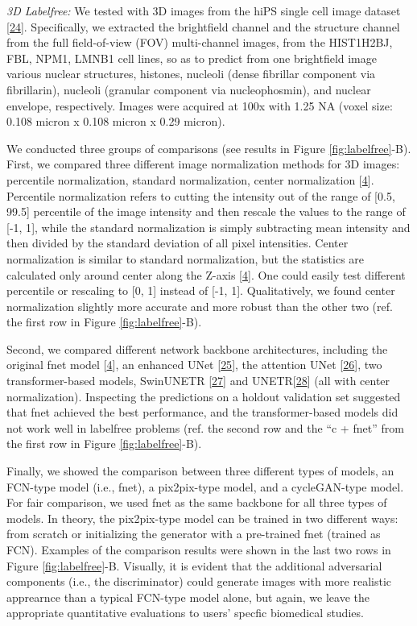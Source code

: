 \emph{3D Labelfree:} We tested with 3D images from the hiPS single cell image dataset {[}\protect\hyperlink{ref-5sGcmDuy}{24}{]}. Specifically, we extracted the brightfield channel and the structure channel from the full field-of-view (FOV) multi-channel images, from the HIST1H2BJ, FBL, NPM1, LMNB1 cell lines, so as to predict from one brightfield image various nuclear structures, histones, nucleoli (dense fibrillar component via fibrillarin), nucleoli (granular component via nucleophosmin), and nuclear envelope, respectively. Images were acquired at 100x with 1.25 NA (voxel size: 0.108 micron x 0.108 micron x 0.29 micron).

We conducted three groups of comparisons (see results in Figure \ref{fig:labelfree}-B). First, we compared three different image normalization methods for 3D images: percentile normalization, standard normalization, center normalization {[}\protect\hyperlink{ref-Yq8wZ6hc}{4}{]}. Percentile normalization refers to cutting the intensity out of the range of {[}0.5, 99.5{]} percentile of the image intensity and then rescale the values to the range of {[}-1, 1{]}, while the standard normalization is simply subtracting mean intensity and then divided by the standard deviation of all pixel intensities. Center normalization is similar to standard normalization, but the statistics are calculated only around center along the Z-axis {[}\protect\hyperlink{ref-Yq8wZ6hc}{4}{]}. One could easily test different percentile or rescaling to {[}0, 1{]} instead of {[}-1, 1{]}. Qualitatively, we found center normalization slightly more accurate and more robust than the other two (ref. the first row in Figure \ref{fig:labelfree}-B).

Second, we compared different network backbone architectures, including the original fnet model {[}\protect\hyperlink{ref-Yq8wZ6hc}{4}{]}, an enhanced UNet {[}\protect\hyperlink{ref-M7480NLD}{25}{]}, the attention UNet {[}\protect\hyperlink{ref-OCow1hly}{26}{]}, two transformer-based models, SwinUNETR {[}\protect\hyperlink{ref-ZWL3IrVc}{27}{]} and UNETR{[}\protect\hyperlink{ref-XCKUntOB}{28}{]} (all with center normalization). Inspecting the predictions on a holdout validation set suggested that fnet achieved the best performance, and the transformer-based models did not work well in labelfree problems (ref. the second row and the ``c + fnet'' from the first row in Figure \ref{fig:labelfree}-B).

Finally, we showed the comparison between three different types of models, an FCN-type model (i.e., fnet), a pix2pix-type model, and a cycleGAN-type model. For fair comparison, we used fnet as the same backbone for all three types of models. In theory, the pix2pix-type model can be trained in two different ways: from scratch or initializing the generator with a pre-trained fnet (trained as FCN). Examples of the comparison results were shown in the last two rows in Figure \ref{fig:labelfree}-B. Visually, it is evident that the additional adversarial components (i.e., the discriminator) could generate images with more realistic apprearnce than a typical FCN-type model alone, but again, we leave the appropriate quantitative evaluations to users' specfic biomedical studies.

